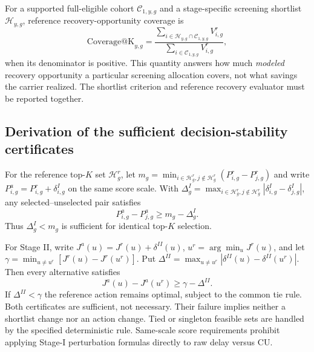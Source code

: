 \documentclass[10pt,a4paper]{article}
\numberwithin{equation}{section}
\begin{document}
For a supported full-eligible cohort $\mathcal C_{1,y,g}$ and a
stage-specific screening shortlist $\mathcal H_{y,g}$, reference
recovery-opportunity coverage is
\begin{equation}
\mathrm{Coverage@K}_{y,g}
=\frac{\sum_{i\in\mathcal H_{y,g}\cap\mathcal C_{1,y,g}}V^r_{i,g}}
{\sum_{i\in\mathcal C_{1,y,g}}V^r_{i,g}},
\label{eq:sup_recovery_coverage}
\end{equation}
when its denominator is positive. This quantity answers how much
\emph{modeled} recovery opportunity a particular screening allocation covers, not what savings the carrier realized. The shortlist criterion and reference recovery evaluator must be reported together.

\subsection{Derivation of the sufficient decision-stability certificates}
For the reference top-$K$ set $\mathcal H_g^r$, let
$m_g=\min_{i\in\mathcal H_g^r,j\notin\mathcal H_g^r}
(P^r_{i,g}-P^r_{j,g})$ and write
$P^a_{i,g}=P^r_{i,g}+\delta^I_{i,g}$ on the same score scale.
With $\Delta_g^I=\max_{i\in\mathcal H_g^r,j\notin\mathcal H_g^r}
|\delta^I_{i,g}-\delta^I_{j,g}|$, any selected--unselected pair
satisfies
\begin{equation}
P^a_{i,g}-P^a_{j,g}
\ge m_g-\Delta_g^I.
\label{eq:sup_stability_stage1}
\end{equation}
Thus $\Delta_g^I<m_g$ is sufficient for identical top-$K$ selection.

For Stage II, write $J^a(u)=J^r(u)+\delta^{II}(u)$,
$u^r=\arg\min_uJ^r(u)$, and let
$\gamma=\min_{u\neq u^r}[J^r(u)-J^r(u^r)]$. Put
$\Delta^{II}=\max_{u\neq u^r}
|\delta^{II}(u)-\delta^{II}(u^r)|$.
Then every alternative satisfies
\begin{equation}
J^a(u)-J^a(u^r)\ge\gamma-\Delta^{II}.
\label{eq:sup_stability_stage2}
\end{equation}
If $\Delta^{II}<\gamma$ the reference action remains optimal, subject to the common tie rule. Both certificates are sufficient, not necessary. Their failure implies neither a shortlist change nor an action change. Tied or singleton feasible sets are handled by the specified deterministic rule. Same-scale score requirements prohibit applying Stage-I perturbation formulas directly to raw delay versus CU.
\end{document}
